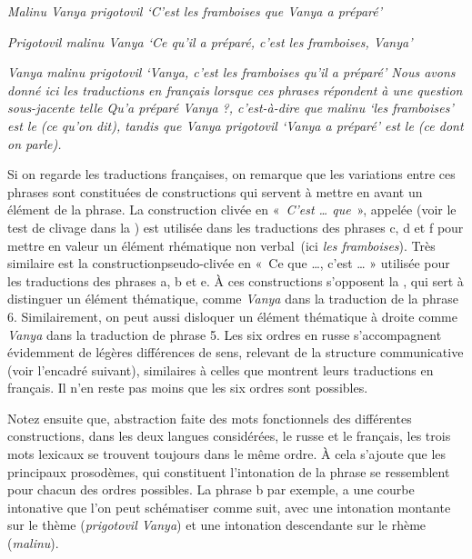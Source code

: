{    \ex\itshape Malinu Vanya prigotovil
    \glt   ‘C’est les framboises que Vanya a préparé’

    \ex\itshape Prigotovil malinu Vanya
    \glt ‘Ce qu’il a préparé, c’est les framboises, Vanya’

    \ex\itshape Vanya malinu prigotovil
    \glt  ‘Vanya, c’est les framboises qu’il a préparé’
\z
\z
    Nous avons donné ici les traductions en français lorsque ces phrases répondent à une question sous-jacente telle \textit{Qu’a préparé Vanya} ?, c’est-à-dire que \textit{malinu} ‘les framboises’ est le  (ce qu’on dit), tandis que \textit{Vanya prigotovil} ‘Vanya a préparé’ est le  (ce dont on parle).

    Si on regarde les traductions françaises, on remarque que les variations entre ces phrases sont constituées de constructions qui servent à mettre en avant un élément de la phrase. La construction clivée en «~\textit{C’est … que}~», appelée  (voir le test de clivage dans la ) est utilisée dans les traductions des phrases c, d et f pour mettre en valeur un élément rhématique non verbal~(ici \textit{les framboises}). Très similaire est la constructionpseudo-clivée en «~Ce que …, c’est … » utilisée pour les traductions des phrases a, b et e. À ces constructions s’opposent la , qui sert à distinguer un élément thématique, comme \textit{Vanya} dans la traduction de la phrase 6. Similairement, on peut aussi disloquer un élément thématique à droite comme \textit{Vanya} dans la traduction de phrase 5. Les six ordres en russe s’accompagnent évidemment de légères différences de sens, relevant de la structure communicative (voir l’encadré suivant), similaires à celles que montrent leurs traductions en français. Il n’en reste pas moins que les six ordres sont possibles.

    Notez ensuite que, abstraction faite des mots fonctionnels des différentes constructions, dans les deux langues considérées, le russe et le français, les trois mots lexicaux se trouvent toujours dans le même ordre. À cela s’ajoute que les principaux prosodèmes, qui constituent l’intonation de la phrase se ressemblent pour chacun des ordres possibles. La phrase b par exemple, a une courbe intonative que l’on peut schématiser comme suit, avec une intonation montante sur le thème (\textit{prigotovil Vanya}) et une intonation descendante sur le rhème (\textit{malinu}).

}
